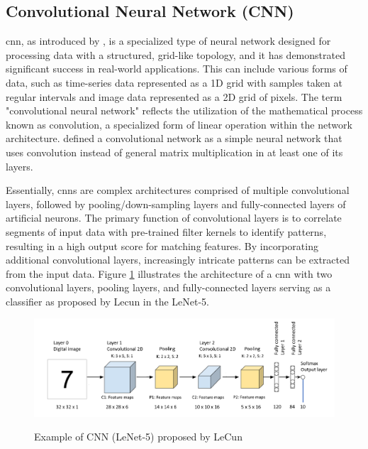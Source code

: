 \subsection{Convolutional Neural Network (CNN)}
\label{subsec:convolutional_neural_network_CNN}

\gls{cnn}, as introduced by \textcite{Lecun1998}, is a specialized type of neural network designed for processing data with a structured, grid-like topology, and it has demonstrated significant success in real-world applications. This can include various forms of data, such as time-series data represented as a 1D grid with samples taken at regular intervals and image data represented as a 2D grid of pixels. The term "convolutional neural network" reflects the utilization of the mathematical process known as convolution, a specialized form of linear operation within the network architecture. \textcite{Goodfellow2016} defined a convolutional network as a simple neural network that uses convolution instead of general matrix multiplication in at least one of its layers.

Essentially, \gls{cnn}s are complex architectures comprised of multiple convolutional layers, followed by pooling/down-sampling layers and fully-connected layers of artificial neurons. The primary function of convolutional layers is to correlate segments of input data with pre-trained filter kernels to identify patterns, resulting in a high output score for matching features. By incorporating additional convolutional layers, increasingly intricate patterns can be extracted from the input data. Figure \ref{fig:frmwk_cnn_LeNet-5} illustrates the architecture of a \gls{cnn} with two convolutional layers, pooling layers, and fully-connected layers serving as a classifier as proposed by Lecun in the LeNet-5.

\begin{figure}[htbp]
    \raggedright
        \caption{Example of CNN (LeNet-5) proposed by LeCun}
        \includegraphics[width=1\textwidth]{resources/images/030-theoretical_framework/Framework_cnn_LeNet-5.png}
        \label{fig:frmwk_cnn_LeNet-5}
\end{figure}

